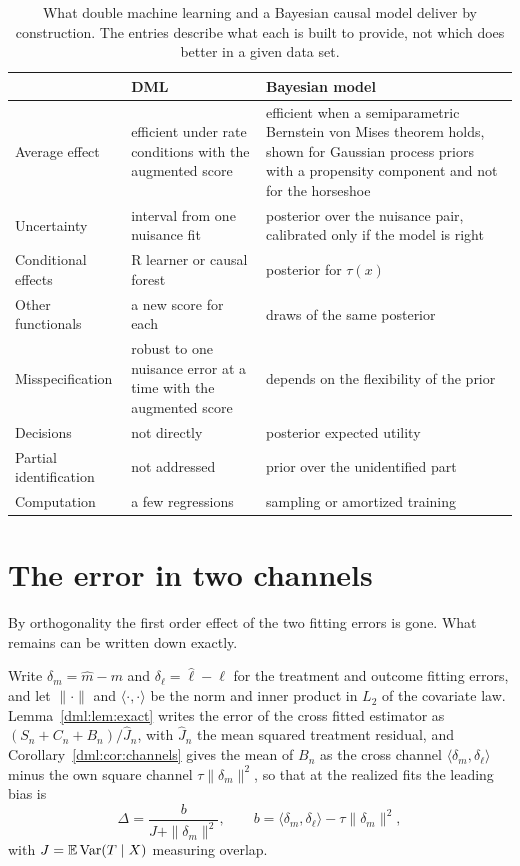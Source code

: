 \begin{table}[ht]
\centering
\small
\caption{What double machine learning and a Bayesian causal model deliver by construction. The entries describe what each is built to provide, not which does better in a given data set.}
\label{tab:dml:compare}
\begin{tabular}{@{}L{1.15in}L{1.5in}L{1.5in}@{}}
\toprule
 & DML & Bayesian model \\
\midrule
Average effect & efficient under rate conditions with the augmented score & efficient when a semiparametric Bernstein von Mises theorem holds, shown for Gaussian process priors with a propensity component and not for the horseshoe \\
Uncertainty & interval from one nuisance fit & posterior over the nuisance pair, calibrated only if the model is right \\
Conditional effects & R learner or causal forest & posterior for $\tau(x)$ \\
Other functionals & a new score for each & draws of the same posterior \\
Misspecification & robust to one nuisance error at a time with the augmented score & depends on the flexibility of the prior \\
Decisions & not directly & posterior expected utility \\
Partial identification & not addressed & prior over the unidentified part \\
Computation & a few regressions & sampling or amortized training \\
\bottomrule
\end{tabular}
\end{table}

\section{The error in two channels}\label{sec:crit:channels}

 By orthogonality the first order effect of the two fitting errors is gone. What remains can be written down exactly.

Write $\delta_m = \hat m - m$ and $\delta_\ell = \hat\ell - \ell$ for the treatment and outcome fitting errors, and let $\|\cdot\|$ and $\langle\cdot,\cdot\rangle$ be the norm and inner product in $L_2$ of the covariate law. Lemma~\ref{dml:lem:exact} writes the error of the cross fitted estimator as $(S_n + C_n + B_n)/\hat J_n$, with $\hat J_n$ the mean squared treatment residual, and Corollary~\ref{dml:cor:channels} gives the mean of $B_n$ as the cross channel $\langle\delta_m,\delta_\ell\rangle$ minus the own square channel $\tau\|\delta_m\|^2$, so that at the realized fits the leading bias is
\begin{equation}
\Delta = \frac{b}{J + \|\delta_m\|^2}, \qquad b = \langle\delta_m,\delta_\ell\rangle - \tau\|\delta_m\|^2,
\label{eq:crit:bias}
\end{equation}
with $J = \mathbb{E}\,\mathrm{Var}(T \mid X)$ measuring overlap.

